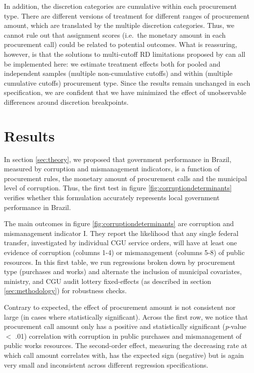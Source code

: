 \documentclass[11pt]{article}
\begin{document}
In addition, the discretion categories are cumulative within each procurement type. There are different versions of treatment for different ranges of procurement amount, which are translated by the multiple discretion categories. Thus, we cannot rule out that assignment scores (i.e.~the monetary amount in each procurement call) could be related to potential outcomes. What is reassuring, however, is that the solutions to multi-cutoff RD limitations proposed by \citet{CattaneoInterpretingRegressionDiscontinuity2016} can all be implemented here: we estimate treatment effects both for pooled and independent samples (multiple non-cumulative cutoffs) and within (multiple cumulative cutoffs) procurement type. Since the results remain unchanged in each specification, we are confident that we have minimized the effect of unobservable differences around discretion breakpoints.

\section{Results} \label{sec:result}

In section \ref{sec:theory}, we proposed that government performance in Brazil, measured by corruption and mismanagement indicators, is a function of procurement rules, the monetary amount of procurement calls and the municipal level of corruption. Thus, the first test in figure \ref{fig:corruptiondeterminants} verifies whether this formulation accurately represents local government performance in Brazil.

\clearpage

The main outcomes in figure \ref{fig:corruptiondeterminants} are corruption and mismanagement indicator I. They report the likelihood that any single federal transfer, investigated by individual CGU service orders, will have at least one evidence of corruption (columns 1-4) or mismanagement (columns 5-8) of public resources. In this first table, we run regressions broken down by procurement type (purchases and works) and alternate the inclusion of municipal covariates, ministry, and CGU audit lottery fixed-effects (as described in section \ref{sec:methodology}) for robustness checks.

Contrary to expected, the effect of procurement amount is not consistent nor large (in cases where statistically significant). Across the first row, we notice that procurement call amount only has a positive and statistically significant (\emph{p}-value $<$ .01) correlation with corruption in public purchases and mismanagement of public works resources. The second-order effect, measuring the decreasing rate at which call amount correlates with, has the expected sign (negative) but is again very small and inconsistent across different regression specifications.
\end{document}
